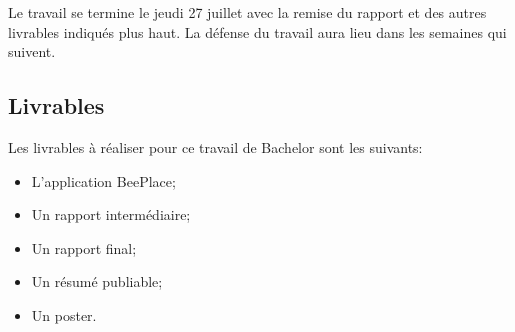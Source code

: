 Le travail se termine le jeudi 27 juillet avec la remise du rapport et des autres livrables indiqués plus haut. La défense du travail aura lieu dans les semaines qui suivent.

\subsection{Livrables}

Les livrables à réaliser pour ce travail de Bachelor sont les suivants:

\begin{itemize}
  \item L'application BeePlace;
  \item Un rapport intermédiaire;
  \item Un rapport final;
  \item Un résumé publiable;
  \item Un poster.
\end{itemize}


